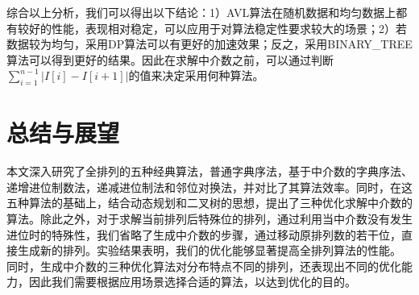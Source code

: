 \documentclass[10pt, twocolumn]{ctexart}
\begin{document}
综合以上分析，我们可以得出以下结论：1）AVL算法在随机数据和均匀数据上都有较好的性能，表现相对稳定，可以应用于对算法稳定性要求较大的场景；2）若数据较为均匀，采用DP算法可以有更好的加速效果；反之，采用BINARY\_TREE算法可以得到更好的结果。因此在求解中介数之前，可以通过判断$\sum_{i=1}^{n-1}\left|I[i]-I[i+1]\right|$的值来决定采用何种算法。



\section{总结与展望}
本文深入研究了全排列的五种经典算法，普通字典序法，基于中介数的字典序法、递增进位制数法，递减进位制法和邻位对换法，并对比了其算法效率。同时，在这五种算法的基础上，结合动态规划和二叉树的思想，提出了三种优化求解中介数的算法。除此之外，对于求解当前排列后特殊位的排列，通过利用当中介数没有发生进位时的特殊性，我们省略了生成中介数的步骤，通过移动原排列数的若干位，直接生成新的排列。实验结果表明，我们的优化能够显著提高全排列算法的性能。 同时，生成中介数的三种优化算法对分布特点不同的排列，还表现出不同的优化能力，因此我们需要根据应用场景选择合适的算法，以达到优化的目的。

\printbibliography
\end{document}
